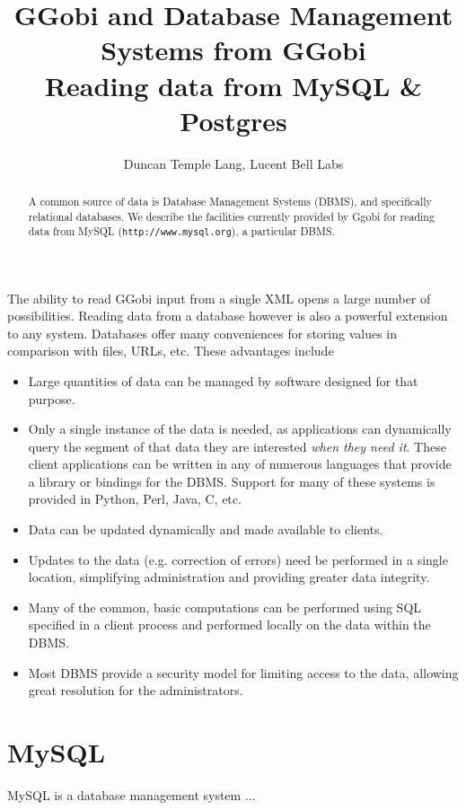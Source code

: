 \documentclass{article}
\title{GGobi and Database Management Systems from GGobi\\ 
Reading data from MySQL \& Postgres
}
\author{
Duncan Temple Lang, Lucent Bell Labs
}
\def\URL#1{\texttt{#1}}
\begin{document}
\maketitle

\begin{abstract}
  A common source of data is Database Management Systems (DBMS), and
  specifically relational databases.  We describe the facilities
  currently provided by Ggobi for reading data from MySQL
  (\URL{http://www.mysql.org}), a particular DBMS.
\end{abstract}

The ability to read GGobi input from a single XML opens a large number
of possibilities.  Reading data from a database however is also a
powerful extension to any system.  Databases offer many conveniences
for storing values in comparison with files, URLs, etc.
These advantages include
\begin{itemize}

\item Large quantities of data can be managed by software
 designed for that purpose. 

\item Only a single instance of the data is needed, as applications
  can dynamically query the segment of that data they are interested
  \textsl{when they need it}.  These client applications can be
  written in any of numerous languages that provide a library or
  bindings for the DBMS.  Support for many of these systems is
  provided in Python, Perl, Java, C, etc.

\item Data can be updated dynamically and made available to clients.

\item Updates to the data (e.g. correction of errors) need be
  performed in a single location, simplifying administration
and providing greater data integrity.

\item Many of the common, basic computations can be performed
using SQL specified in a client process and performed locally on the
data within the DBMS.

\item Most DBMS provide a security model for limiting access
to the data, allowing great resolution for the administrators.

\end{itemize}


\section{MySQL}
MySQL is a database management system ...
\end{document}
